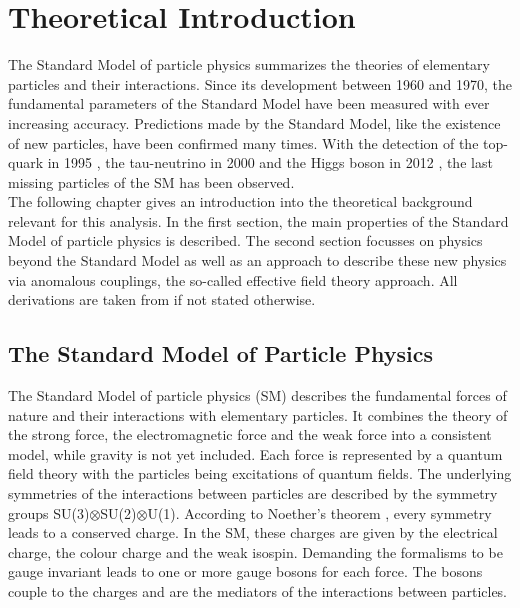 \chapter{Theoretical Introduction}
\label{chap::TheoreticalIntroduction}
The Standard Model of particle physics summarizes the theories of elementary particles and their interactions. Since its development between 1960 and 1970, the fundamental parameters of the Standard Model have been measured with ever increasing accuracy. Predictions made by the Standard Model, like the existence of new particles, have been confirmed many times. With the detection of the top-quark in 1995 \cite{top_detection1,top_detection2}, the tau-neutrino in 2000 \cite{tau_nu_detection} and the Higgs boson in 2012 \cite{cms_higgsdiscov,atlas_higgsdiscov}, the last missing particles of the SM has been observed.\\

The following chapter gives an introduction into the theoretical background relevant for this analysis. In the first section, the main properties of the Standard Model of particle physics is described. The second section focusses on physics beyond the Standard Model as well as an approach to describe these new physics via anomalous couplings, the so-called effective field theory approach. All derivations are taken from \cite{peskin,mandl} if not stated otherwise.

\section{The Standard Model of Particle Physics}
The Standard Model of particle physics (SM) describes the fundamental forces of nature and their interactions with elementary particles. It combines the theory of the strong force, the electromagnetic force and the weak force into a consistent model, while gravity is not yet included. Each force is represented by a quantum field theory with the particles being excitations of quantum fields. The underlying symmetries of the interactions between particles are described by the symmetry groups SU(3)$\otimes$SU(2)$\otimes$U(1). According to Noether's theorem \cite{noether}, every symmetry leads to a conserved charge. In the SM, these charges are given by the electrical charge, the colour charge and the weak isospin. Demanding the formalisms to be gauge invariant leads to one or more gauge bosons for each force. The bosons couple to the charges and are the mediators of the interactions between particles.\\

